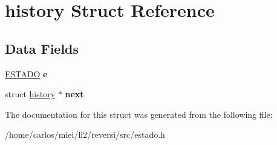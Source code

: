 \hypertarget{structhistory}{}\section{history Struct Reference}
\label{structhistory}
\subsection*{Data Fields}
\begin{DoxyCompactItemize}
\item 
\mbox{\label{structhistory_a16c51a92277e0711269fe818d6a8efa3}} 
\mbox{\hyperlink{structestado}{E\+S\+T\+A\+DO}} {\bfseries e}
\item 
\mbox{\label{structhistory_a6bad528b02c3b70434848bef3b66dab2}} 
struct \mbox{\hyperlink{structhistory}{history}} $\ast$ {\bfseries next}
\end{DoxyCompactItemize}


The documentation for this struct was generated from the following file\+:\begin{DoxyCompactItemize}
\item 
/home/carlos/miei/li2/reversi/src/estado.\+h\end{DoxyCompactItemize}

